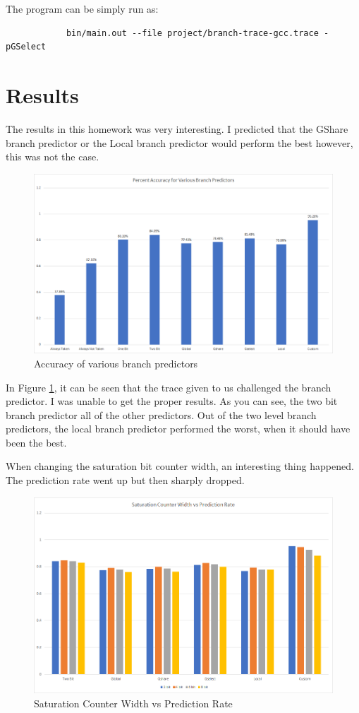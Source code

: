 \documentclass{article}
\begin{document}
        The program can be simply run as:
        \begin{lstlisting}
            bin/main.out --file project/branch-trace-gcc.trace -pGSelect
        \end{lstlisting}
    \section{Results}
        The results in this homework was very interesting. I predicted that the GShare branch predictor or the Local branch predictor would perform the best however, this was not the case.
        \begin{figure}[H]
            \centering
            \label{fig:bp_results}
            \includegraphics[width=\textwidth]{bp_results.png}
            \caption{Accuracy of various branch predictors}
        \end{figure}
        In Figure \ref{fig:bp_results}, it can be seen that the trace given to us challenged the branch predictor. I was unable to get the proper results. As you can see, the two bit branch predictor all of the other predictors. Out of the two level branch predictors, the local branch predictor performed the worst, when it should have been the best. \par
        When changing the saturation bit counter width, an interesting thing happened. The prediction rate went up but then sharply dropped.
        \begin{figure}[H]
            \centering
            \label{fig:sat_results}
            \includegraphics[width=\textwidth]{sat_results.png}
            \caption{Saturation Counter Width vs Prediction Rate}
        \end{figure}
\end{document}
